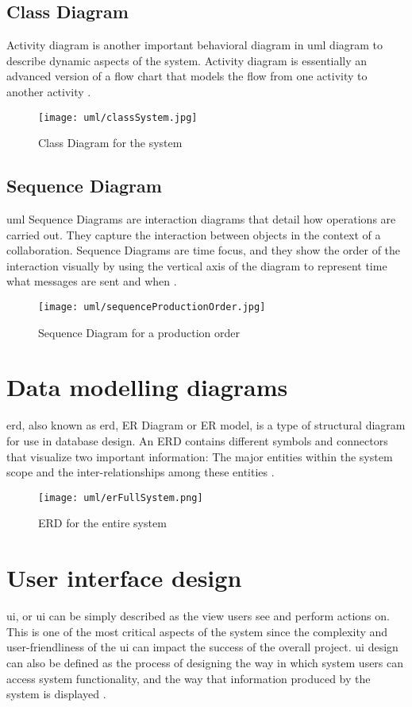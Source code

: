 \documentclass[12pt]{report}
\begin{document}
\newpage
\subsection{Class Diagram}
Activity diagram is another important behavioral diagram in \acrshort{uml} diagram to describe dynamic aspects of the system. Activity diagram is essentially an advanced version of a flow chart that models the flow from one activity to another activity \cite{vparadigm_2018_uml}.

\begin{figure}[H]
	\centering
	\texttt{[image: uml/classSystem.jpg]}
	\caption{Class Diagram for the system}
\end{figure}

\newpage
\subsection{Sequence Diagram}
\acrshort{uml} Sequence Diagrams are interaction diagrams that detail how operations are carried out. They capture the interaction between objects in the context of a collaboration. Sequence Diagrams are time focus, and they show the order of the interaction visually by using the vertical axis of the diagram to represent time what messages are sent and when \cite{vparadigm_2018_uml}.

\begin{figure}[H]
	\centering
	\texttt{[image: uml/sequenceProductionOrder.jpg]}
	\caption{Sequence Diagram for a production order}
\end{figure}

\section{Data modelling diagrams}
\acrlong{erd}, also known as \acrshort{erd}, ER Diagram or ER model, is a type of structural diagram for use in database design. An ERD contains different symbols and connectors that visualize two important information: The major entities within the system scope and the inter-relationships among these entities \cite{vparadigm_2018_uml}.

\begin{figure}[H]
	\centering
	\texttt{[image: uml/erFullSystem.png]}
	\caption{ERD for the entire system}
\end{figure}

\newpage
\section{User interface design}
\acrlong{ui}, or \acrshort{ui} can be simply described as the view users see and perform actions on. This is one of the most critical aspects of the system since the complexity and user-­friendliness of the \acrshort{ui} can impact the success of the overall project. \acrshort{ui} design can also be defined as the process of designing the way in which system users can access system functionality, and the way that information produced by the system is displayed \cite{sommerville_2008_se}.
\end{document}
